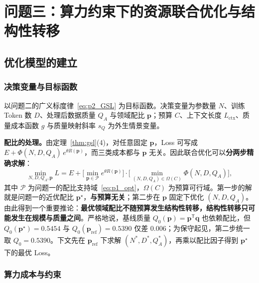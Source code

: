 \section{问题三：算力约束下的资源联合优化与结构性转移}
\label{sec:problem3}

\subsection{优化模型的建立}

\subsubsection{决策变量与目标函数}

以问题二的广义标度律~\eqref{eq:p2_GSL} 为目标函数。决策变量为参数量 $N$、训练 Token 数 $D$、处理后数据质量 $Q_A$ 与领域配比 $\boldsymbol p$；预算 $C$、上下文长度 $L_{\mathrm{ctx}}$、质量成本函数 $g$ 与质量映射斜率 $s_Q$ 为外生情景变量。

\textbf{配比的处理。}由定理~\ref{thm:gsl}(4)，对任意固定 $\boldsymbol p$，Loss 可写成 $E+\Phi(N,D,Q_A)\,e^{\theta R(\boldsymbol p)}$，而三类成本都与 $\boldsymbol p$ 无关。因此联合优化可以\textbf{分两步精确求解}：
\begin{equation}
\min_{N,D,Q_A,\boldsymbol p}L=E+\Big[\min_{\boldsymbol p\in\mathcal P}e^{\theta R(\boldsymbol p)}\Big]\cdot\Big[\min_{(N,D,Q_A)\in\Omega(C)}\Phi(N,D,Q_A)\Big],
\label{eq:p3_separable}
\end{equation}
其中 $\mathcal P$ 为问题一的配比支持域~\eqref{eq:p1_opt}，$\Omega(C)$ 为预算可行域。第一步的解就是问题一的近优配比 $\boldsymbol p^\star$，\textbf{与预算无关}；第二步在 $\boldsymbol p$ 固定下优化 $(N,D,Q_A)$。由此得到一个重要推论：\textbf{最优领域配比不随预算发生结构性转移，结构性转移只可能发生在规模与质量之间}。严格地说，基线质量 $Q_0(\boldsymbol p)=\boldsymbol p^{\mathsf T}\boldsymbol q$ 也依赖配比，但 $Q_0(\boldsymbol p^\star)=0.5454$ 与 $Q_0(\boldsymbol p_{\mathrm{ref}})=0.5390$ 仅差 $0.006$；为保守起见，第二步统一取 $Q_0=0.5390$。下文先在 $\boldsymbol p_{\mathrm{ref}}$ 下求解 $(N^*,D^*,Q_A^*)$，再乘以配比因子得到 $\boldsymbol p^\star$ 下的最优 Loss。

\subsubsection{算力成本与约束}

